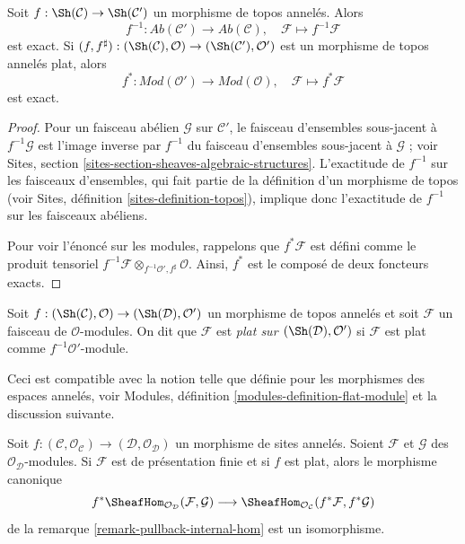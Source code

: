 \begin{lemma}

\label{lemma-flat-pullback-exact}
Soit $f : \Sh(\mathcal{C}) \to \Sh(\mathcal{C}')$ un morphisme de topos
annelés. Alors
$$
f^{-1} : \textit{Ab}(\mathcal{C}') \longrightarrow \textit{Ab}(\mathcal{C}),
\quad
\mathcal{F} \longmapsto f^{-1}\mathcal{F}
$$ est exact. Si $(f, f^\sharp) :
(\Sh(\mathcal{C}), \mathcal{O})
\to
(\Sh(\mathcal{C}'), \mathcal{O}')$ est un morphisme de topos annelés plat, alors $$
f^* : \textit{Mod}(\mathcal{O}') \longrightarrow \textit{Mod}(\mathcal{O}),
\quad
\mathcal{F} \longmapsto f^*\mathcal{F}
$$ est exact.
\end{lemma}

\begin{proof}
Pour un faisceau abélien $\mathcal{G}$ sur $\mathcal{C}'$, le faisceau
d'ensembles sous-jacent à $f^{-1}\mathcal{G}$ est l'image inverse par
$f^{-1}$ du faisceau d'ensembles sous-jacent à $\mathcal{G}$ ; voir Sites,
section \ref{sites-section-sheaves-algebraic-structures}. L'exactitude de
$f^{-1}$ sur les faisceaux d'ensembles, qui fait partie de la définition
d'un morphisme de topos (voir Sites, définition
\ref{sites-definition-topos}), implique donc l'exactitude de $f^{-1}$ sur les
faisceaux abéliens.

\medskip\noindent

Pour voir l'énoncé sur les modules, rappelons que $f^*\mathcal{F}$ est défini comme le produit tensoriel
$f^{-1}\mathcal{F} \otimes_{f^{-1}\mathcal{O}', f^\sharp} \mathcal{O}$.
Ainsi, $f^*$ est le composé de deux foncteurs exacts.

\end{proof}

\begin{definition}

\label{definition-flat-module}
Soit $f : (\Sh(\mathcal{C}), \mathcal{O}) \to
(\Sh(\mathcal{D}), \mathcal{O}')$ un morphisme de topos annelés et soit
$\mathcal{F}$ un faisceau de $\mathcal{O}$-modules. On dit que
$\mathcal{F}$ est {\it plat sur
$(\Sh(\mathcal{D}), \mathcal{O}')$} si $\mathcal{F}$ est plat comme
$f^{-1}\mathcal{O}'$-module.
\end{definition}

\noindent
Ceci est compatible avec la notion telle que définie pour les morphismes des espaces annelés, voir Modules, définition \ref{modules-definition-flat-module} et la discussion suivante.

\begin{lemma}

\label{lemma-pullback-internal-hom}
Soit $f : (\mathcal{C}, \mathcal{O}_\mathcal{C}) \to
(\mathcal{D}, \mathcal{O}_\mathcal{D})$ un morphisme de sites annelés.
Soient $\mathcal{F}$ et $\mathcal{G}$ des
$\mathcal{O}_\mathcal{D}$-modules. Si $\mathcal{F}$ est de présentation
finie et si $f$ est plat, alors le morphisme canonique
$$
f^*\SheafHom_{\mathcal{O}_\mathcal{D}}(\mathcal{F}, \mathcal{G})
\longrightarrow
\SheafHom_{\mathcal{O}_\mathcal{C}}(f^*\mathcal{F}, f^*\mathcal{G})
$$
de la remarque \ref{remark-pullback-internal-hom} est un isomorphisme.
\end{lemma}

